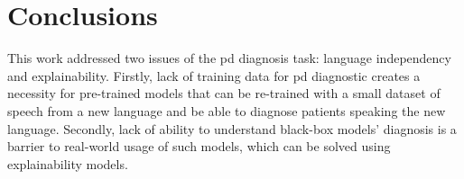 
\chapter{Conclusions}
\label{ch:magna}


This work addressed two issues of the \gls{pd} diagnosis task: language independency and explainability. Firstly, lack of training data for \gls{pd} diagnostic creates a necessity for pre-trained models that can be re-trained with a small dataset of speech from a new language and be able to diagnose patients speaking the new language. Secondly, lack of ability to understand black-box models' diagnosis is a barrier to real-world usage of such models, which can be solved using explainability models. \\
